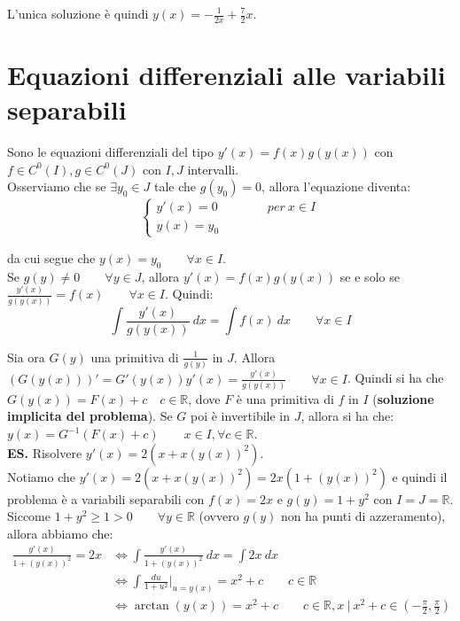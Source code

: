 \documentclass{article}
\begin{document}
\noindent L'unica soluzione è quindi $y(x) = - \frac{1}{2x} + \frac{7}{2}x$.

\section{Equazioni differenziali alle variabili separabili}
Sono le equazioni differenziali del tipo $y'(x) = f(x)g(y(x))$ con $f \in C^0(I), g \in C^0(J)$ con $I, J$ intervalli. \\
Osserviamo che se $\exists y_0 \in J$ tale che $g(y_0) = 0$, allora l'equazione diventa:
\begin{equation*}
    \begin{cases}
        y'(x) = 0 \qquad \qquad per \ x \in I \\
        y(x) = y_0
    \end{cases}
\end{equation*}

\noindent da cui segue che $y(x) = y_0 \qquad \forall x \in I$.\\
Se $g(y) \neq 0 \qquad \forall y \in J$, allora $y'(x) = f(x)g(y(x))$ se e solo se $\frac{y'(x)}{g(y(x))} = f(x) \qquad \forall x \in I$. Quindi:
\begin{equation*}
    \int \frac{y'(x)}{g(y(x))} \ dx = \int f(x) \ dx \qquad \forall x \in I
\end{equation*}

\noindent Sia ora $G(y)$ una primitiva di $\frac{1}{g(y)}$ in $J$. Allora $(G(y(x)))' = G'(y(x))y'(x) = \frac{y'(x)}{g(y(x)) } \qquad \forall x \in I$. Quindi si ha che $G(y(x)) = F(x) + c \quad c \in \mathbb{R}$, dove $F$ è una primitiva di $f$ in $I$ (\textbf{soluzione implicita del problema}). Se $G$ poi è invertibile in $J$, allora si ha che: $y(x) = G^{-1}(F(x) + c) \qquad x \in I, \forall c \in \mathbb{R}$. \\

\noindent\textbf{ES.} Risolvere $y'(x) = 2(x + x(y(x))^2)$.\\
Notiamo che $y'(x) = 2(x + x(y(x))^2) = 2x(1 + (y(x))^2)$ e quindi il problema è a variabili separabili con $f(x) = 2x$ e $g(y) = 1 + y^2$ con $I = J = \mathbb{R}$.\\
Siccome $1 + y^2 \geq 1 > 0 \qquad \forall y \in \mathbb{R}$ (ovvero $g(y)$ non ha punti di azzeramento), allora abbiamo che:
\begin{align*}
    \frac{y'(x)}{1 + (y(x))^2} = 2x & \iff \int \frac{y'(x)}{1 + (y(x))^2} \ dx = \int 2x \ dx \\
    &\iff \int \frac{du}{1 + u^2} \bigg|_{u = y(x)} = x^2 + c \qquad c \in \mathbb{R} \\
    &\iff \arctan(y(x)) = x^2 + c \qquad c \in \mathbb{R}, x \ | \ x^2 + c \in \left(-\frac{\pi}{2}, \frac{\pi}{2}\right)
\end{align*}
\end{document}
